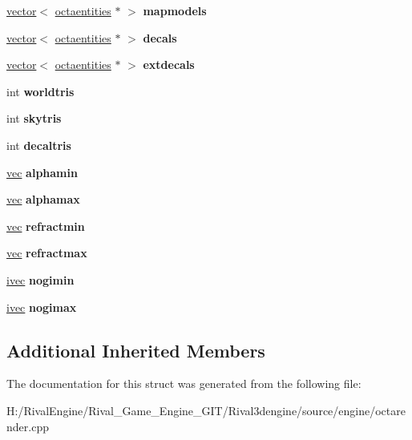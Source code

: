 \begin{DoxyCompactItemize}
\item 
\mbox{\label{structvacollect_a4af51b256a62089535fd901406362e62}} 
\hyperlink{structvector}{vector}$<$ \hyperlink{structoctaentities}{octaentities} $\ast$ $>$ {\bfseries mapmodels}
\item 
\mbox{\label{structvacollect_ae394e786c3c1534781da0bfa147c723e}} 
\hyperlink{structvector}{vector}$<$ \hyperlink{structoctaentities}{octaentities} $\ast$ $>$ {\bfseries decals}
\item 
\mbox{\label{structvacollect_aa40a97211d5fa4f09bf7fe6362cf7072}} 
\hyperlink{structvector}{vector}$<$ \hyperlink{structoctaentities}{octaentities} $\ast$ $>$ {\bfseries extdecals}
\item 
\mbox{\label{structvacollect_a24204b0a88b33d2127da6a974d4f4f62}} 
int {\bfseries worldtris}
\item 
\mbox{\label{structvacollect_aa1b699984dde65b33c7e00c27d795d8a}} 
int {\bfseries skytris}
\item 
\mbox{\label{structvacollect_a30d37e7abe972469a5eedab7feee3a78}} 
int {\bfseries decaltris}
\item 
\mbox{\label{structvacollect_ad453062791fa65669c03be59ab529948}} 
\hyperlink{structvec}{vec} {\bfseries alphamin}
\item 
\mbox{\label{structvacollect_a68a3c4c1897ef8c6f53bd02741efe00f}} 
\hyperlink{structvec}{vec} {\bfseries alphamax}
\item 
\mbox{\label{structvacollect_a6f16765350a1eabd91770779b1f2c29b}} 
\hyperlink{structvec}{vec} {\bfseries refractmin}
\item 
\mbox{\label{structvacollect_a9077c0eea0759bbc6a973ce48392fccb}} 
\hyperlink{structvec}{vec} {\bfseries refractmax}
\item 
\mbox{\label{structvacollect_a9c5e638d7a3637558f1baac54f77a443}} 
\hyperlink{structivec}{ivec} {\bfseries nogimin}
\item 
\mbox{\label{structvacollect_aff0c3d38b2a01cb80a4fe21e0aae023b}} 
\hyperlink{structivec}{ivec} {\bfseries nogimax}
\end{DoxyCompactItemize}
\subsection*{Additional Inherited Members}


The documentation for this struct was generated from the following file\+:\begin{DoxyCompactItemize}
\item 
H\+:/\+Rival\+Engine/\+Rival\+\_\+\+Game\+\_\+\+Engine\+\_\+\+G\+I\+T/\+Rival3dengine/source/engine/octarender.\+cpp\end{DoxyCompactItemize}
